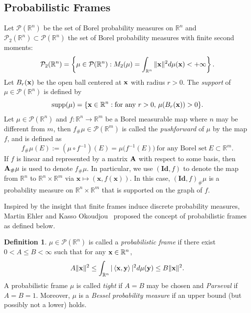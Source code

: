 \documentclass{amsart}
\numberwithin{equation}{section}
\DeclareMathOperator{\supp}{supp}
\theoremstyle{plain}
\theoremstyle{remark}
\theoremstyle{definition}
\newtheorem{definition}[theorem]{Definition}
\begin{document}
\subsection{Probabilistic Frames}
Let $\mathcal{P}(\mathbb{R}^n)$ be the set of Borel probability measures on $\mathbb{R}^n$ and $\mathcal{P}_2(\mathbb{R}^n) \subset \mathcal{P}(\mathbb{R}^n)$  the set of Borel probability measures with finite second moments:
\begin{equation*}
   \mathcal{P}_2(\mathbb{R}^n) = \left\{ \mu \in \mathcal{P}(\mathbb{R}^n): M_2(\mu) = \int_{\mathbb{R}^n} \Vert {\bf x} \Vert ^2 d\mu({\bf x}) < + \infty \right\}.
\end{equation*}
Let $B_r({\bf x})$ be the open ball centered at ${\bf x}$ with radius $r>0$.  The \textit{support} of $\mu \in  \mathcal{P}(\mathbb{R}^n)$ is defined by 
$$\supp(\mu) = \{ {\bf x} \in \mathbb{R}^n: \text{for any} \ r>0, \,\mu(B_r({\bf x}))>0  \}.$$
Let $\mu \in  \mathcal{P}(\mathbb{R}^n) $ and $f: \mathbb{R}^n \rightarrow \mathbb{R}^m$ be a Borel measurable map where $n$ may be different from $m$, then $f_{\#} \mu \in \mathcal{P}(\mathbb{R}^m)$ is called the \textit{pushforward} of $\mu$ by  the map $f$,  and is defined as
$$f_{\#} \mu (E) := (\mu \circ f^{-1}) (E) = \mu \big (f^{-1}(E) \big ) \ \text{for any Borel set}  \ E \subset \mathbb{R}^m.$$ If $f$ is linear and represented by a matrix ${\bf A}$ with respect to some basis, then ${\bf A}_{\#} \mu$ is used to denote $f_{\#} \mu$. In particular, we use $(\mathbf{Id}, f)$ to denote the map from $\mathbb{R}^n$ to $\mathbb{R}^n \times \mathbb{R}^m$ via $\mathbf{x} \mapsto (\mathbf{x}, f(\mathbf{x}))$. In this case, $(\mathbf{Id}, f)_\#\mu$ is a probability measure on $\mathbb{R}^n \times \mathbb{R}^m$ that is supported on the graph of $f$.

Inspired by the insight that finite frames induce discrete probability measures, Martin Ehler and Kasso Okoudjou~\cite{ehler2012random, ehler2013probabilistic} proposed the concept of probabilistic frames as defined below. 

\begin{definition}
$\mu \in  \mathcal{P}(\mathbb{R}^n)$ is called a \emph{probabilistic frame} if there exist $0<A \leq B < \infty$ such that for any ${\bf x} \in \mathbb{R}^n$, 
\begin{equation*}
    A \Vert {\bf x}  \Vert^2 \leq\int_{\mathbb{R}^n} \vert \left\langle {\bf x},{\bf y} \right\rangle \vert ^2 d\mu({\bf y})  \leq B \Vert {\bf x}  \Vert^2.
\end{equation*}
A probabilistic frame $\mu$ is called \emph{tight} if $A = B$ may be chosen and \emph{Parseval} if $A = B=1$. Moreover, $\mu$ is a \emph{Bessel probability measure} if an upper bound (but possibly not a lower) holds. 
\end{definition}
\end{document}
